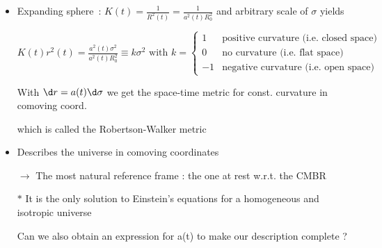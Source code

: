 \Tr
\begin{itemize}
\item Expanding sphere~: $\displaystyle K(t)=\frac{1}{R^{2}(t)}=\frac{1}{a^{2}(t)R^{2}_{0}}$
      and arbitrary scale of $\sigma$ yields
\item[] {\blue $\displaystyle K(t)r^{2}(t)=\frac{a^{2}(t)\sigma^{2}}{a^{2}(t)R^{2}_{0}} \equiv k\sigma^{2} \text{ with } k=
         \begin{cases}
         1 & \text{positive curvature (i.e. closed space)}\\
         0 & \text{no curvature (i.e. flat space)}\\
         -1 & \text{negative curvature (i.e. open space)}
         \end{cases}
        $}
\item[] With {\blue $\d r=a(t)\d\sigma$} we get the space-time metric for const. curvature in comoving coord.
\item[] \begin{center}
         {\red {}}
        \end{center}
\item[] which is called the {\blue Robertson-Walker metric}
\item Describes the universe in comoving coordinates
\item[] $\rightarrow$ The most natural reference frame : the one at rest w.r.t. the CMBR
\item[$\ast$] It is the only solution to Einstein's equations for a homogeneous and isotropic universe
\item[] {\blue Can we also obtain an expression for a(t) to make our description complete ?}
\end{itemize}
